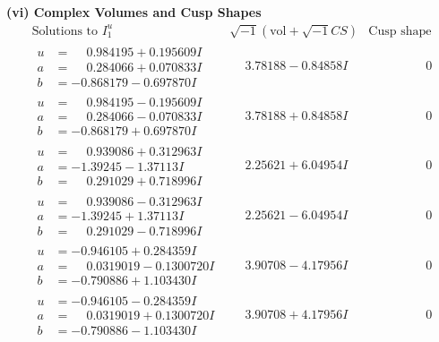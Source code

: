 \documentclass[1p]{elsarticle_modified}
\theoremstyle{definition}
\newcommand{\I}{\sqrt{-1}}
\begin{document}
\newpage\flushleft \textbf{(vi) Complex Volumes and Cusp Shapes}
$$\begin{array}{c|c|c}  
\text{Solutions to }I^u_{1}& \I (\text{vol} + \sqrt{-1}CS) & \text{Cusp shape}\\
 \hline 
\begin{aligned}
u &= \phantom{-}0.984195 + 0.195609 I \\
a &= \phantom{-}0.284066 + 0.070833 I \\
b &= -0.868179 - 0.697870 I\end{aligned}
 & \phantom{-}3.78188 - 0.84858 I & \phantom{-0.000000 } 0 \\ \hline\begin{aligned}
u &= \phantom{-}0.984195 - 0.195609 I \\
a &= \phantom{-}0.284066 - 0.070833 I \\
b &= -0.868179 + 0.697870 I\end{aligned}
 & \phantom{-}3.78188 + 0.84858 I & \phantom{-0.000000 } 0 \\ \hline\begin{aligned}
u &= \phantom{-}0.939086 + 0.312963 I \\
a &= -1.39245 - 1.37113 I \\
b &= \phantom{-}0.291029 + 0.718996 I\end{aligned}
 & \phantom{-}2.25621 + 6.04954 I & \phantom{-0.000000 } 0 \\ \hline\begin{aligned}
u &= \phantom{-}0.939086 - 0.312963 I \\
a &= -1.39245 + 1.37113 I \\
b &= \phantom{-}0.291029 - 0.718996 I\end{aligned}
 & \phantom{-}2.25621 - 6.04954 I & \phantom{-0.000000 } 0 \\ \hline\begin{aligned}
u &= -0.946105 + 0.284359 I \\
a &= \phantom{-}0.0319019 - 0.1300720 I \\
b &= -0.790886 + 1.103430 I\end{aligned}
 & \phantom{-}3.90708 - 4.17956 I & \phantom{-0.000000 } 0 \\ \hline\begin{aligned}
u &= -0.946105 - 0.284359 I \\
a &= \phantom{-}0.0319019 + 0.1300720 I \\
b &= -0.790886 - 1.103430 I\end{aligned}
 & \phantom{-}3.90708 + 4.17956 I & \phantom{-0.000000 } 0 \\ \hline\begin{aligned}

\end{aligned}
\end{array}$$
\end{document}
